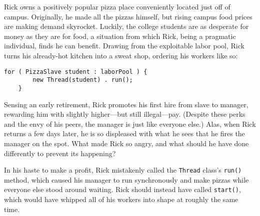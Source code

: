 Rick owns a positively popular pizza place conveniently located just off of campus.
	Originally, he made all the pizzas himself, but rising campus food prices are making demand skyrocket.
	Luckily, the college students are as desperate for money as they are for food, a situation from which Rick, being a pragmatic individual, finds he can benefit.
	Drawing from the exploitable labor pool, Rick turns his already-hot kitchen into a sweat shop, ordering his workers like so:
	\begin{lstlisting}[numbers=none]
	for ( PizzaSlave student : laborPool ) {
		new Thread(student) . run();
	}
	\end{lstlisting}
	Sensing an early retirement, Rick promotes his first hire from slave to manager, rewarding him with slightly higher---but still illegal---pay.
	(Despite these perks and the envy of his peers, the manager is just like everyone else.)
	Alas, when Rick returns a few days later, he is so displeased with what he sees that he fires the manager on the spot.
	What made Rick so angry, and what should he have done differently to prevent its happening?

	\begin{answer}
	In his haste to make a profit, Rick mistakenly called the \texttt{Thread} class's \texttt{run()} method, which caused his manager to run synchronously and make pizzas while everyone else stood around waiting.
	Rick should instead have called \texttt{start()}, which would have whipped all of his workers into shape at roughly the same time.
	\end{answer}